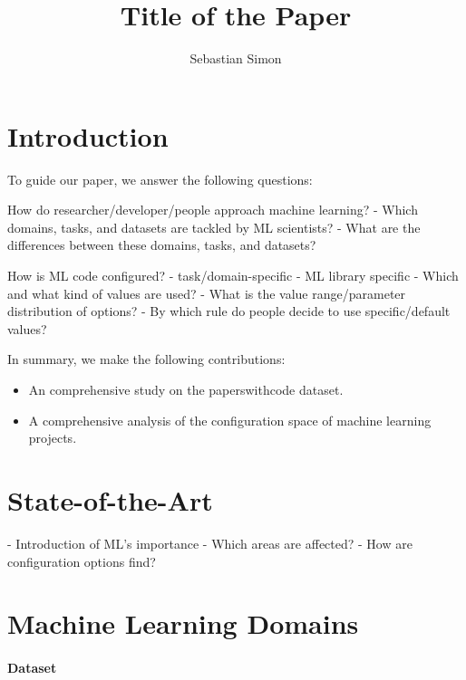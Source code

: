 \documentclass[sigconf,review,anonymous]{acmart}
\title{Title of the Paper}
\author{Sebastian Simon}
\affiliation{%
    \institution{Leipzig University}
    \country{Germany}
}
\begin{document}
\maketitle

\section{Introduction}\label{sec:intro}



To guide our paper, we answer the following questions:
\begin{questions}
    \item How do researcher/developer/people approach machine learning?
    - Which domains, tasks, and datasets are tackled by ML scientists?
    - What are the differences between these domains, tasks, and datasets?    
    \item How is ML code configured?
    - task/domain-specific 
    - ML library specific
    - Which and what kind of values are used?
    - What is the value range/parameter distribution of options?
    - By which rule do people decide to use specific/default values?
\end{questions}

In summary, we make the following contributions:
\begin{itemize}
    \item An comprehensive study on the paperswithcode dataset.
    \item A comprehensive analysis of the configuration space of machine learning projects.
\end{itemize}


\section{State-of-the-Art}\label{sec:background}
- Introduction of ML's importance
- Which areas are affected?
- How are configuration options find?


\section{Machine Learning Domains}\label{sec:ml_domains}

\paragraph{Dataset}
\end{document}
